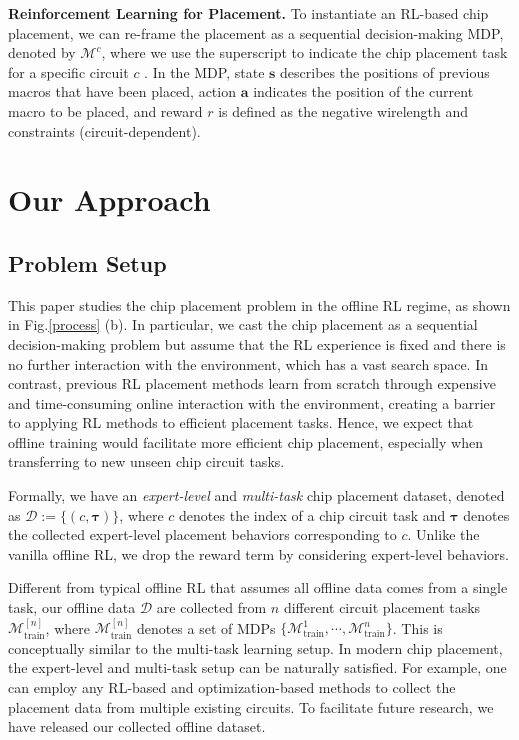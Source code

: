 \documentclass{article}
\newcommand{\bs}{\bm{s}}
\newcommand{\ba}{\bm{a}}
\newcommand{\bc}{{c}}
\newcommand{\btau}{\bm{\tau}}
\theoremstyle{plain}
\theoremstyle{definition}
\theoremstyle{remark}
\begin{document}
\textbf{Reinforcement Learning for Placement.} To instantiate an RL-based chip placement, we can re-frame the placement as a sequential decision-making MDP, denoted by $\mathcal{M}^{c}$, where we use the superscript to indicate the chip placement task for a specific circuit $c$ \cite{mirhoseini2021graph, lai2022maskplace}. 
In the MDP, state $\bs$ describes the positions of previous macros that have been placed, action $\ba$ indicates the position of the current macro to be placed, and reward $r$ is defined as the negative wirelength and constraints (circuit-dependent).
\section{Our Approach}



\subsection{Problem Setup}
This paper studies the chip placement problem in the offline RL regime, as shown in Fig.\ref{process} (b). 
In particular, we cast the chip placement as a sequential decision-making problem but assume that the RL experience is fixed and there is no further interaction with the environment, which has a vast search space.  
In contrast, previous RL placement methods learn from scratch through expensive and time-consuming online interaction with the environment, creating a barrier to applying RL methods to {efficient} placement tasks.
Hence, we expect that offline training would facilitate more efficient chip placement, especially when transferring to new unseen chip circuit tasks.

Formally,  we have an \textit{expert-level} and \textit{multi-task} chip placement dataset, denoted as  $\mathcal{D}:=\{(\bc, \btau)\}$, where $\bc$ denotes the index of a chip circuit task and $\btau$ denotes the collected expert-level placement behaviors corresponding to $\bc$. 
Unlike the vanilla offline RL, we drop the reward term by considering expert-level behaviors. 

Different from typical offline RL that assumes  all offline data comes from a single task, our offline data $\mathcal{D}$ are collected from $n$ different circuit placement tasks $\mathcal{M}_{\text{train}}^{[n]}$, where $\mathcal{M}_{\text{train}}^{[n]}$ denotes a set of MDPs $\{\mathcal{M}_{\text{train}}^1, \cdots, \mathcal{M}_{\text{train}}^{n}\}$. This is conceptually similar to the multi-task learning setup. 
In modern chip placement, the {expert-level} and {multi-task} setup  can be naturally satisfied. For example, one can employ any RL-based and
optimization-based methods to collect the  placement data from multiple existing circuits. To facilitate future research, we have released our collected offline {dataset}.
\end{document}
